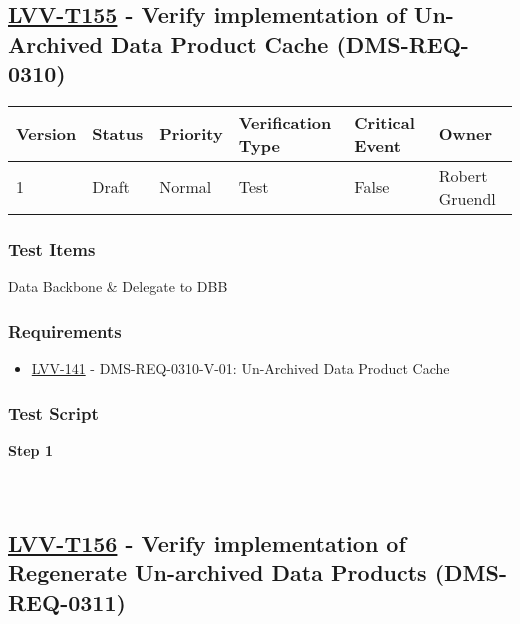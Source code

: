 \hypertarget{lvv-t155---verify-implementation-of-un-archived-data-product-cache-dms-req-0310}{%
\subsection{\texorpdfstring{\href{https://jira.lsstcorp.org/secure/Tests.jspa\#/testCase/LVV-T155}{LVV-T155}
- Verify implementation of Un-Archived Data Product Cache
(DMS-REQ-0310)}{LVV-T155 - Verify implementation of Un-Archived Data Product Cache (DMS-REQ-0310)}}\label{lvv-t155---verify-implementation-of-un-archived-data-product-cache-dms-req-0310}}

\begin{longtable}[]{@{}llllll@{}}
\toprule
Version & Status & Priority & Verification Type & Critical Event &
Owner\tabularnewline
\midrule
\endhead
1 & Draft & Normal & Test & False & Robert Gruendl\tabularnewline
\bottomrule
\end{longtable}

\hypertarget{test-items-55}{%
\subsubsection{Test Items}\label{test-items-55}}

Data Backbone \& Delegate to DBB

\hypertarget{requirements-55}{%
\subsubsection{Requirements}\label{requirements-55}}

\begin{itemize}
\tightlist
\item
  \href{https://jira.lsstcorp.org/browse/LVV-141}{LVV-141} -
  DMS-REQ-0310-V-01: Un-Archived Data Product Cache
\end{itemize}

\hypertarget{test-script-55}{%
\subsubsection{Test Script}\label{test-script-55}}

\textbf{Step 1}\\
~\\
~\\

\hypertarget{lvv-t156---verify-implementation-of-regenerate-un-archived-data-products-dms-req-0311}{%
\subsection{\texorpdfstring{\href{https://jira.lsstcorp.org/secure/Tests.jspa\#/testCase/LVV-T156}{LVV-T156}
- Verify implementation of Regenerate Un-archived Data Products
(DMS-REQ-0311)}{LVV-T156 - Verify implementation of Regenerate Un-archived Data Products (DMS-REQ-0311)}}\label{lvv-t156---verify-implementation-of-regenerate-un-archived-data-products-dms-req-0311}}

